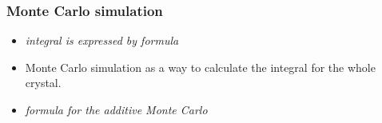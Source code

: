 \subsubsection{Monte Carlo simulation}
\label{label:monteCarlo}

\begin{itemize}

  \item \textit{integral is expressed by formula} \cite[Daniel's Thesis]{}

  \item Monte Carlo simulation as a way to calculate the integral for the whole
    crystal.

  \item \textit{formula for the additive Monte Carlo}

\end{itemize}






